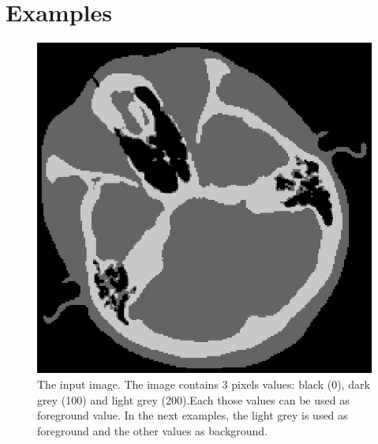 \documentclass{InsightArticle}
\begin{document}
\section{Examples}

\begin{figure}[b]
\centering
\includegraphics{2th_cthead1.eps}
\caption{The input image. The image contains 3 pixels values: black (0), dark
grey (100) and light grey (200).Each those values can be used as foreground
value. In the next examples, the light grey is used as foreground and the other
values as background.}
\end{figure}
\end{document}
